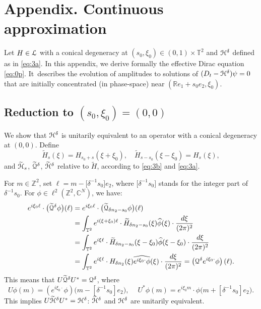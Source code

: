 \documentclass[11pt]{article}
\numberwithin{equation}{section}
\let\pazocal\EuScript
\theoremstyle{definition}
\newcommand{\QQ}{{\pazocal{Q}}}
\newcommand{\LL}{{\pazocal{L}}}
\newcommand{\HH}{\pazocal{H}}
\newcommand{\tHH}{\widetilde{\HH}{}}
\newcommand{\tQQ}{\widetilde{\QQ}{}}
\newcommand{\C}{\mathbb{C}}
\newcommand{\R}{\mathbb{R}}
\newcommand{\Z}{\mathbb{Z}}
\newcommand{\Tt}{{\mathbb{T}}}
\newcommand{\tH}{{\widetilde{H}}}
\newcommand{\hphi}{{\widehat{\phi}}}
\begin{document}
\appendix
{}
\section*{Appendix. Continuous approximation}
Let $H \in \LL$ with a conical degeneracy at $(s_0, \xi_0) \in (0,1) \times \Tt^2$ and $\HH^\delta$ defined as in \eqref{eq:3a}. In this appendix, we derive formally the effective Dirac equation \eqref{eq:0p}. It~describes the evolution of amplitudes to solutions of $(D_t-\HH^\delta) \psi = 0$ that are initially concentrated (in phase-space) near $(\R e_1+s_0e_2,\xi_0)$.

\subsection{Reduction to $(s_0, \xi_0) = (0,0)$}\label{sec:6.1} We show that $\HH^\delta$ is unitarily equivalent to an operator with a conical degeneracy at $(0,0)$. Define
\begin{equation}\label{eq:3f}
\tH_s(\xi) = H_{s_0+s}(\xi+\xi_0), \quad \tH_{s-s_0}(\xi-\xi_0) = H_s(\xi),
\end{equation}
and $\tHH_s$, $\tQQ^\delta$, $\tHH^\delta$ relative to $\tH$, according to \eqref{eq:3b} and \eqref{eq:3a}.

For $m \in \Z^2$, set $\ell = m - \bigl[\delta^{-1} s_0\bigr] e_2$, where $\bigl[\delta^{-1} s_0\bigr]$ stands for the integer part of $\delta^{-1} s_0$.
For $\phi \in \ell^2(\Z^2,\C^N)$, we have:
\[
\begin{split}
e^{i\xi_0 \ell } \cdot \bigl( \tQQ^\delta \phi \bigr)(\ell)
&= e^{i\xi_0 \ell } \cdot \bigl( \tQQ_{\delta n_2-s_0} \phi \bigr)(\ell)
\\
&= \int_{\Tt^2} e^{i(\xi+\xi_0) \ell} \cdot \tH_{\delta n_2-s_0}(\xi) \hphi(\xi) \cdot \dfrac{d\xi}{(2\pi)^2}\\
&= \int_{\Tt^2} e^{i\xi \ell} \cdot \tH_{\delta n_2-s_0}(\xi-\xi_0) \hphi(\xi-\xi_0) \cdot \dfrac{d\xi}{(2\pi)^2}
\\
&= \int_{\Tt^2} e^{i\xi \ell} \cdot H_{\delta n_2}(\xi) \widehat{e^{i\xi_0 \cdot}\phi}(\xi) \cdot \dfrac{d\xi}{(2\pi)^2} = \left(\QQ^\delta e^{i\xi_0 \cdot} \phi\right) (\ell).
\end{split}
\]
This means that $U \tQQ^\delta U^* = \QQ^\delta$, where
\begin{equation*}
U \phi(m) = \left(e^{i\xi_0 \cdot} \phi\right)\bigl( m - [\delta^{-1}s_0] e_2\bigr), \quad \ U^* \phi(m) = e^{i\xi_0 m} \cdot \phi\bigl( m + [\delta^{-1}s_0] e_2 \bigr).
\end{equation*}
This implies $U \tHH^\delta U^* = \HH^\delta$: $\tHH^\delta$ and $\HH^\delta$ are unitarily equivalent.
\end{document}
